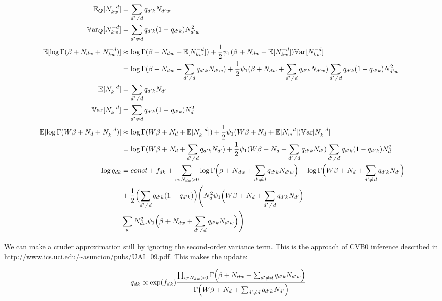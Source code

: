 \documentclass{report}
\newcommand{\E}{\mathbb{E}}
\newcommand{\Var}{\mathbb{V}\mathrm{ar}}
\begin{document}
\begin{align*}
   \E_Q[N^{-d}_{kw}] &= \sum_{d' \neq d} q_{d'k} N_{d'w} \\
   \Var_Q[N^{-d}_{kw}] &= \sum_{d' \neq d} q_{d'k}(1-q_{d'k}) N^2_{d'w} \\
  \E[\log\Gamma(\beta + N_{dw} + N^{-d}_{kw})] & \approx
    \log\Gamma(\beta + N_{dw} + \E[N^{-d}_{kw}]) + \frac12 \psi_1(\beta
    + N_{dw} + \E[N^{-d}_{kw}]) \Var[N^{-d}_{kw}] \\
    &=     \log\Gamma(\beta + N_{dw} + \sum_{d' \neq d} q_{d'k} N_{d'w}) + \frac12 \psi_1(\beta
    + N_{dw} + \sum_{d' \neq d} q_{d'k} N_{d'w}) \sum_{d' \neq d} q_{d'k}(1-q_{d'k}) N^2_{d'w}
\\
    \E[N^{-d}_{k}] &= \sum_{d' \neq d} q_{d'k} N_{d'} \\
   \Var[N^{-d}_{k}] &= \sum_{d' \neq d} q_{d'k}(1-q_{d'k}) N^2_{d} \\
  \E[\log\Gamma(W\beta + N_{d} + N^{-d}_{k})] & \approx
    \log\Gamma(W\beta + N_{d} + \E[N^{-d}_{k}]) + \frac12 \psi_1(W\beta
    + N_{d} + \E[N^{-d}_{w}]) \Var[N^{-d}_{k}] \\
    &=     \log\Gamma(W\beta + N_{d} + \sum_{d' \neq d} q_{d'k} N_{d'}) + \frac12 \psi_1(W\beta
    + N_{d} + \sum_{d' \neq d} q_{d'k} N_{d'}) \sum_{d' \neq d}
    q_{d'k}(1-q_{d'k}) N^2_{d}
\\
\log q_{dk} &= const + f_{dk} + \sum_{w : N_{dw}>0}  \log\Gamma\Bigl(\beta + N_{dw} + \sum_{d'
  \neq d} q_{d'k} N_{d'w}\Bigr) - \log\Gamma\Bigl(W\beta + N_{d} + \sum_{d'
  \neq d} q_{d'k} N_{d'}\Bigr) \\
  & + \frac12 \Bigl(\sum_{d' \neq d} q_{d'k}(1-q_{d'k})\Bigr) \Biggl(N^2_d \psi_1\Bigl(W\beta
    + N_{d} + \sum_{d' \neq d} q_{d'k} N_{d'}\Bigr) - \\
    & \sum_w
  N^2_{dw} \psi_1\Bigl(\beta + N_{dw} + \sum_{d' \neq d} q_{d'k} N_{d'w}\Bigr)\Biggr)
\end{align*}

We can make a cruder approximation still by ignoring the second-order
variance term. This is the approach of CVB0 inference described in
\url{http://www.ics.uci.edu/~asuncion/pubs/UAI_09.pdf}. This makes the
update:

\begin{align*}
  q_{dk} &\propto \exp(f_{dk}) \frac{ \prod_{w : N_{dw}>0} \Gamma\Bigl(\beta + N_{dw} + \sum_{d'
  \neq d} q_{d'k} N_{d'w}\Bigr)}{\Gamma\Bigl(W\beta + N_{d} + \sum_{d'
  \neq d} q_{d'k} N_{d'}\Bigr)}
\end{align*}
\end{document}
